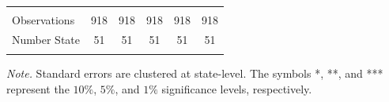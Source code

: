 \documentclass[dv_diss_main.tex]{subfiles}
\begin{document}
\begin{table}[H]
\begin{center}
{\begin{tabular}{lccccc}
    \vspace{4pt} & \begin{footnotesize}\end{footnotesize} & \begin{footnotesize}\end{footnotesize} & \begin{footnotesize}\end{footnotesize} & \begin{footnotesize}\end{footnotesize} & \begin{footnotesize}\end{footnotesize} \\
    Observations & 918 & 918 & 918 & 918 & 918 \\
    Number State & 51 & 51 & 51 & 51 & 51 \\
     \hline
     \\
    \end{tabular}
    }
    
    \end{center}
    \footnotesize{\textit{Note. }Standard errors are clustered at state-level. The symbols *, **, and *** represent the $10\%$, $5\%$, and $1\%$ significance levels, respectively.}
\end{table}
\end{document}
